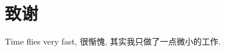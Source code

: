 \documentclass[a4paper]{article}
\begin{document}
\pagebreak[4]
\thispagestyle{empty}
\section*{致谢}
\begin{spacing}{1.5}
\songti
Time flies very fast, 很惭愧, 其实我只做了一点微小的工作.
\end{spacing}
\end{document}
